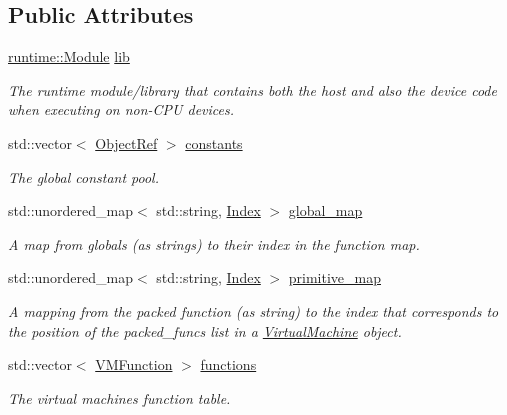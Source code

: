 \subsection*{Public Attributes}
\begin{DoxyCompactItemize}
\item 
\hyperlink{classtvm_1_1runtime_1_1Module}{runtime\+::\+Module} \hyperlink{classtvm_1_1runtime_1_1vm_1_1Executable_a0d69e974364e3f2eb643c25b77c74015}{lib}
\begin{DoxyCompactList}\small\item\em The runtime module/library that contains both the host and also the device code when executing on non-\/\+C\+PU devices. \end{DoxyCompactList}\item 
std\+::vector$<$ \hyperlink{classtvm_1_1runtime_1_1ObjectRef}{Object\+Ref} $>$ \hyperlink{classtvm_1_1runtime_1_1vm_1_1Executable_a64a56d507939eee688f485057a2c7d2e}{constants}
\begin{DoxyCompactList}\small\item\em The global constant pool. \end{DoxyCompactList}\item 
std\+::unordered\+\_\+map$<$ std\+::string, \hyperlink{namespacetvm_1_1runtime_1_1vm_a3597867d2db714bf760876a23d6b7d3d}{Index} $>$ \hyperlink{classtvm_1_1runtime_1_1vm_1_1Executable_a9a808f0c63ae0d65ad8d625e3a7cb749}{global\+\_\+map}
\begin{DoxyCompactList}\small\item\em A map from globals (as strings) to their index in the function map. \end{DoxyCompactList}\item 
std\+::unordered\+\_\+map$<$ std\+::string, \hyperlink{namespacetvm_1_1runtime_1_1vm_a3597867d2db714bf760876a23d6b7d3d}{Index} $>$ \hyperlink{classtvm_1_1runtime_1_1vm_1_1Executable_ab5a31e8670a4f20564abc48610a90e8c}{primitive\+\_\+map}
\begin{DoxyCompactList}\small\item\em A mapping from the packed function (as string) to the index that corresponds to the position of the {\ttfamily packed\+\_\+funcs} list in a {\ttfamily \hyperlink{classtvm_1_1runtime_1_1vm_1_1VirtualMachine}{Virtual\+Machine}} object. \end{DoxyCompactList}\item 
std\+::vector$<$ \hyperlink{structtvm_1_1runtime_1_1vm_1_1VMFunction}{V\+M\+Function} $>$ \hyperlink{classtvm_1_1runtime_1_1vm_1_1Executable_af7d75150b6a98a7766a552d7e7e34a11}{functions}
\begin{DoxyCompactList}\small\item\em The virtual machine\textquotesingle{}s function table. \end{DoxyCompactList}\end{DoxyCompactItemize}
